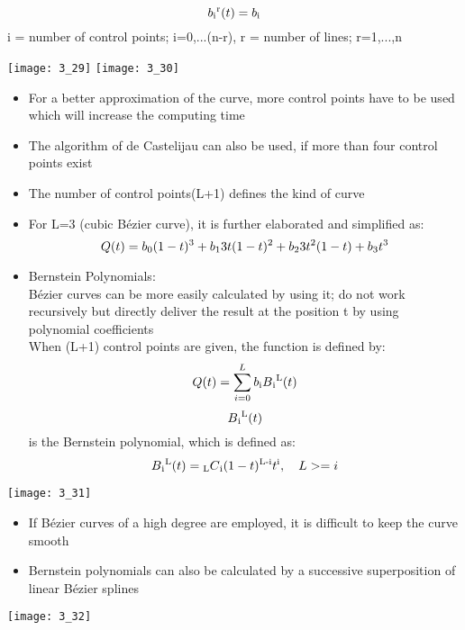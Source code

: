 \documentclass{standalone}
\begin{document}
\begin{itemize}
\begin{itemize}
\begin{equation}
		\end{equation}
		\begin{equation}
			b\textsubscript{i}\textsuperscript{r}(t) = b\textsubscript{i}
		\end{equation}
		i = number of control points; i=0,...(n-r), r = number of lines; r=1,...,n
	\end{itemize}
	\texttt{[image: 3\_29]} \texttt{[image: 3\_30]}
	\begin{itemize}
		\item For a better approximation of the curve, more control points have to be used which will increase the computing time
		\item The algorithm of de Castelijau can also be used, if more than four control points exist
		\item The number of control points(L+1) defines the kind of curve
		\item For L=3 (cubic B\'ezier curve), it is further elaborated and simplified as:
		\begin{equation}
			Q(t) = b\textsubscript{0}(1-t)\textsuperscript{3}+b\textsubscript{1}3t(1-t)\textsuperscript{2}+b\textsubscript{2}3t\textsuperscript{2}(1-t)+b\textsubscript{3}t\textsuperscript{3}
		\end{equation}
		\item Bernstein Polynomials: \\
		B\'ezier curves can be more easily calculated by using it; do not work recursively but directly deliver the result at the position t by using polynomial coefficients \\
		When (L+1) control points are given, the function is defined by:
		\begin{equation}
			Q(t) = \sum_{i=0}^Lb\textsubscript{i} B\textsubscript{i}\textsuperscript{L}(t)
		\end{equation}
		$$ B\textsubscript{i}\textsuperscript{L}(t) $$ is the Bernstein polynomial, which is defined as:
		\begin{equation}
			B\textsubscript{i}\textsuperscript{L}(t)= \textsubscript{L}C\textsubscript{i} (1-t)\textsuperscript{L-i}t\textsuperscript{i}, \quad L >=i
		\end{equation}
	\end{itemize}
	\texttt{[image: 3\_31]}
	\begin{itemize}
		\item If B\'ezier curves of a high degree are employed, it is difficult to keep the curve smooth
		\item Bernstein polynomials can also be calculated by a successive superposition of linear B\'ezier splines
	\end{itemize}
	\texttt{[image: 3\_32]}
\end{itemize}
\end{document}
